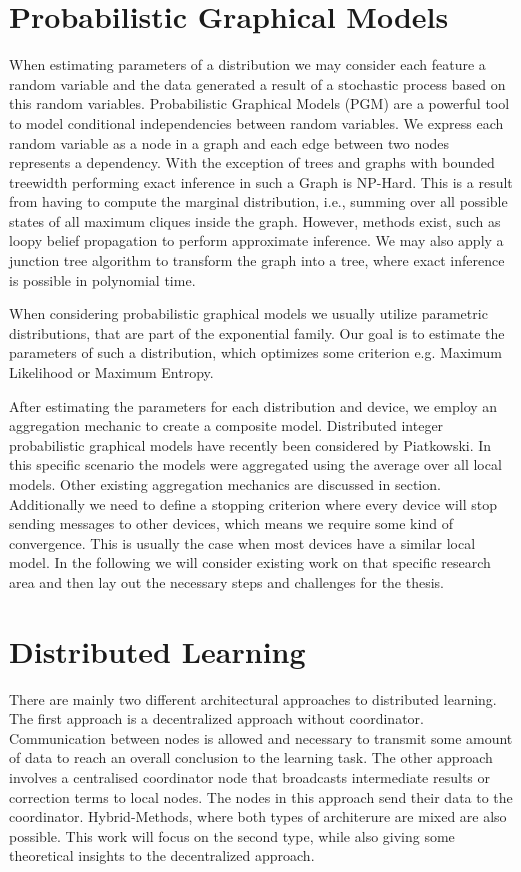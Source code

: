 \section{Probabilistic Graphical Models}
When estimating parameters of a distribution we may consider each feature a random variable and the data generated a result of a stochastic process based on this random variables.
Probabilistic Graphical Models (PGM) are a powerful tool to model conditional independencies between random variables. 
We express each random variable as a node in a graph and each edge between two nodes represents a dependency. 
With the exception of trees and graphs with bounded treewidth performing exact inference in such a Graph is NP-Hard.
This is a result from having to compute the marginal distribution, i.e., summing over all possible states of all maximum cliques inside the graph.
However, methods exist, such as loopy belief propagation to perform approximate inference.
We may also apply a junction tree algorithm to transform the graph into a tree, where exact inference is possible in polynomial time.

When considering probabilistic graphical models we usually utilize parametric distributions, that are part of the exponential family. 
Our goal is to estimate the parameters of such a distribution, which optimizes some criterion e.g. Maximum Likelihood or Maximum Entropy.


After estimating the parameters for each distribution and device, we employ an aggregation mechanic to create a composite model.
Distributed integer probabilistic graphical models \cite{piatkowski2019distributed} have recently been considered by Piatkowski.
In this specific scenario the models were aggregated using the average over all local models.
Other existing aggregation mechanics are discussed in section.
Additionally we need to define a stopping criterion where every device will stop sending messages to other devices, which means we require some kind of convergence.
This is usually the case when most devices have a similar local model.
In the following we will consider existing work on that specific research area and then lay out the necessary steps and challenges for the thesis.

\section{Distributed Learning}
There are mainly two different architectural approaches to distributed learning. 
The first approach is a decentralized approach without coordinator.
Communication between nodes is allowed and necessary to transmit some amount of data to reach an overall conclusion to the learning task.
The other approach involves a centralised coordinator node that broadcasts intermediate results or correction terms to local nodes.
The nodes in this approach send their data to the coordinator. 
Hybrid-Methods, where both types of architerure are mixed are also possible.
This work will focus on the second type, while also giving some theoretical insights to the decentralized approach.

